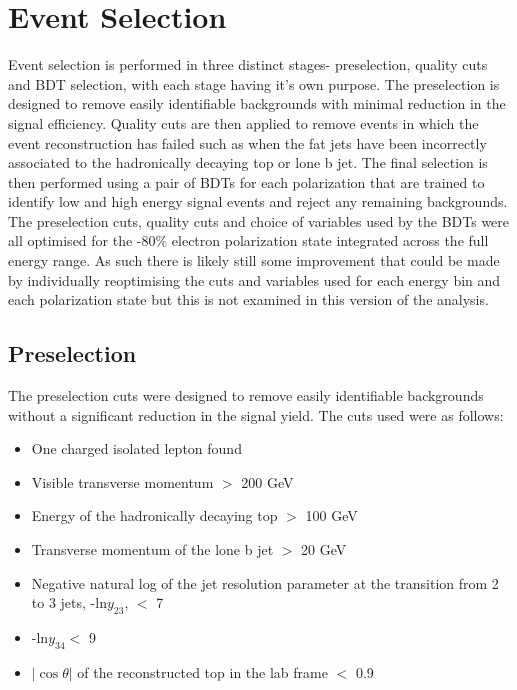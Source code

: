 \section{Event Selection}
\label{Event Selection}

Event selection is performed in three distinct stages- preselection, quality cuts and \ac{BDT} selection, with each stage having it's own purpose. The preselection is designed to remove easily identifiable backgrounds with minimal reduction in the signal efficiency. Quality cuts are then applied to remove events in which the event reconstruction has failed such as when the fat jets have been incorrectly associated to the hadronically decaying top or lone b jet. The final selection is then performed using a pair of \ac{BDT}s for each polarization that are trained to identify low and high energy signal events and reject any remaining backgrounds. The preselection cuts, quality cuts and choice of variables used by the \ac{BDT}s were all optimised for the -80\% electron polarization state integrated across the full energy range. As such there is likely still some improvement that could be made by individually reoptimising the cuts and variables used for each energy bin and each polarization state but this is not examined in this version of the analysis.

\subsection{Preselection}

The preselection cuts were designed to remove easily identifiable backgrounds without a significant reduction in the signal yield. The cuts used were as follows:

\begin{itemize}
\item One charged isolated lepton found
\item Visible transverse momentum $>$ 200 GeV
\item Energy of the hadronically decaying top $>$ 100 GeV
\item Transverse momentum of the lone b jet $>$ 20 GeV
\item Negative natural log of the jet resolution parameter at the transition from 2 to 3 jets, -ln$y_{23}$, $<$ 7
\item -ln$y_{34} <$ 9
\item $|\cos\theta|$ of the reconstructed top in the lab frame $<$ 0.9
\end{itemize}

